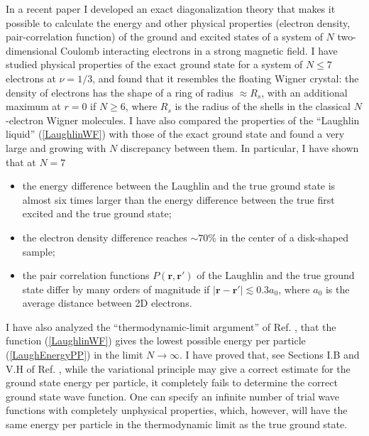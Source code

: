 \documentclass[aps,prb,10pt%
]{revtex4-2}
\begin{document}
In a recent paper \cite{Mikhailov23a} I developed an exact diagonalization theory that makes it possible to calculate the energy and other physical properties (electron density, pair-correlation function) of the ground and excited states of a system of $N$ two-dimensional Coulomb interacting electrons in a strong magnetic field. I have studied physical properties of the exact ground state for a system of $N\le 7$ electrons at $\nu=1/3$, and found that it resembles the floating Wigner crystal: the density of electrons has the shape of a ring of radius $\approx R_s$, with an additional maximum at $r=0$ if $N\ge 6$, where $R_s$ is the radius of the shells in the classical $N$-electron Wigner molecules. I have also compared the properties of the ``Laughlin liquid'' (\ref{LaughlinWF}) with those of the exact ground state and found a very large and growing with $N$ discrepancy between them. In particular, I have shown that at $N=7$
\begin{itemize}
\item the energy difference between the Laughlin and the true ground state is almost six times larger than the energy difference between the true first excited and the true ground state;
\item the electron density difference reaches $\sim 70$\% in the center of a disk-shaped sample;
\item the pair correlation functions $P(\bm r,\bm r')$ of the Laughlin and the true ground state differ by many orders of magnitude if $|\bm r-\bm r'|\lesssim 0.3a_0$, where $a_0$ is the average distance between 2D electrons.
\end{itemize}

I have also analyzed the ``thermodynamic-limit argument'' of Ref. \cite{Laughlin83}, that the function (\ref{LaughlinWF}) gives the lowest possible energy per particle (\ref{LaughEnergyPP}) in the limit $N\to\infty$. I have proved that, see Sections I.B and V.H of Ref. \cite{Mikhailov23a}, while the variational principle may give a correct estimate for the ground state energy per particle, it completely fails to determine the correct ground state wave function. One can specify an infinite number of trial wave functions with completely unphysical properties, which, however, will have the same energy per particle in the thermodynamic limit as the true ground state.
\end{document}
